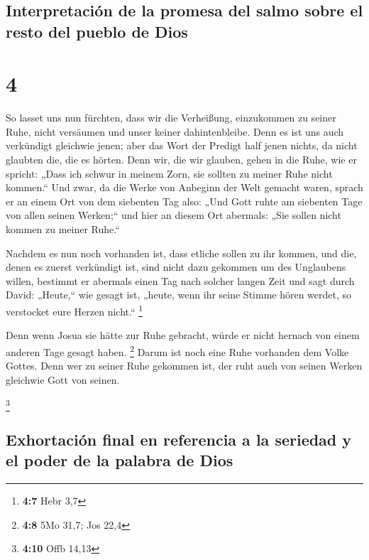 \hypertarget{interpretaciuxf3n-de-la-promesa-del-salmo-sobre-el-resto-del-pueblo-de-dios}{%
\subsection{Interpretación de la promesa del salmo sobre el resto del
pueblo de
Dios}\label{interpretaciuxf3n-de-la-promesa-del-salmo-sobre-el-resto-del-pueblo-de-dios}}

\hypertarget{section-3}{%
\section{4}\label{section-3}}

 So lasset uns nun fürchten, dass wir die Verheißung,
einzukommen zu seiner Ruhe, nicht versäumen und unser keiner
dahintenbleibe.  Denn es ist uns auch verkündigt gleichwie
jenen; aber das Wort der Predigt half jenen nichts, da nicht glaubten
die, die es hörten.  Denn wir, die wir glauben, gehen in
die Ruhe, wie er spricht: „Dass ich schwur in meinem Zorn, sie sollten
zu meiner Ruhe nicht kommen.`` Und zwar, da die Werke von Anbeginn der
Welt gemacht waren,  sprach er an einem Ort von dem
siebenten Tag also: „Und Gott ruhte am siebenten Tage von allen seinen
Werken;``  und hier an diesem Ort abermals: „Sie sollen
nicht kommen zu meiner Ruhe.``

 Nachdem es nun noch vorhanden ist, dass etliche sollen zu
ihr kommen, und die, denen es zuerst verkündigt ist, sind nicht dazu
gekommen um des Unglaubens willen,  bestimmt er abermals
einen Tag nach solcher langen Zeit und sagt durch David: „Heute,`` wie
gesagt ist, „heute, wenn ihr seine Stimme hören werdet, so verstocket
eure Herzen nicht.`` \footnote{\textbf{4:7} Hebr 3,7}

 Denn wenn Josua sie hätte zur Ruhe gebracht, würde er
nicht hernach von einem anderen Tage gesagt haben. \footnote{\textbf{4:8}
  5Mo 31,7; Jos 22,4}  Darum ist noch eine Ruhe vorhanden
dem Volke Gottes.  Denn wer zu seiner Ruhe gekommen ist,
der ruht auch von seinen Werken gleichwie Gott von seinen.

\footnote{\textbf{4:10} Offb 14,13}

\hypertarget{exhortaciuxf3n-final-en-referencia-a-la-seriedad-y-el-poder-de-la-palabra-de-dios}{%
\subsection{Exhortación final en referencia a la seriedad y el poder de
la palabra de
Dios}\label{exhortaciuxf3n-final-en-referencia-a-la-seriedad-y-el-poder-de-la-palabra-de-dios}}

